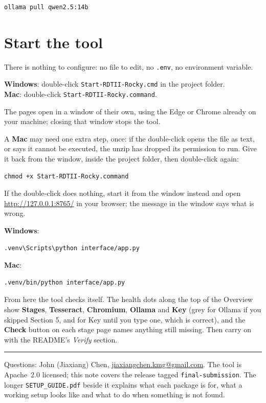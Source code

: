 \documentclass[11pt,a4paper]{article}
\newcommand{\win}{\textbf{Windows}}
\newcommand{\mac}{\textbf{Mac}}
\begin{document}
\begin{lstlisting}
ollama pull qwen2.5:14b
\end{lstlisting}

\section{Start the tool}

There is nothing to configure: no file to edit, no \texttt{.env}, no environment variable.

\win: double-click \texttt{Start-RDTII-Rocky.cmd} in the project folder.\\
\mac: double-click \texttt{Start-RDTII-Rocky.command}.

The pages open in a window of their own, using the Edge or Chrome already on your machine;
closing that window stops the tool.

A \mac{} may need one extra step, once: if the double-click opens the file as text, or
says it cannot be executed, the unzip has dropped its permission to run. Give it back from
the window, inside the project folder, then double-click again:

\begin{lstlisting}
chmod +x Start-RDTII-Rocky.command
\end{lstlisting}

If the double-click does nothing, start it from the window instead and open
\url{http://127.0.0.1:8765/} in your browser; the message in the window says what is wrong.

\win:
\begin{lstlisting}
.venv\Scripts\python interface/app.py
\end{lstlisting}

\mac:
\begin{lstlisting}
.venv/bin/python interface/app.py
\end{lstlisting}

From here the tool checks itself. The health dots along the top of the Overview show
\textbf{Stages}, \textbf{Tesseract}, \textbf{Chromium}, \textbf{Ollama} and \textbf{Key}
(grey for Ollama if you skipped Section 5, and for Key until you type one, which is
correct), and the \textbf{Check} button on each stage page names anything still missing.
Then carry on with the README's \emph{Verify} section.

\vspace{4mm}
\noindent\rule{\textwidth}{0.4pt}

\small
Questions: John (Jiaxiang) Chen, \href{mailto:jiaxiangchen.kmg@gmail.com}{jiaxiangchen.kmg@gmail.com}.
The tool is Apache~2.0 licensed; this note covers the release tagged \texttt{final-submission}.
The longer \texttt{SETUP\_GUIDE.pdf} beside it explains what each package is for, what a working setup looks like and what to do when something is not found.
\end{document}
